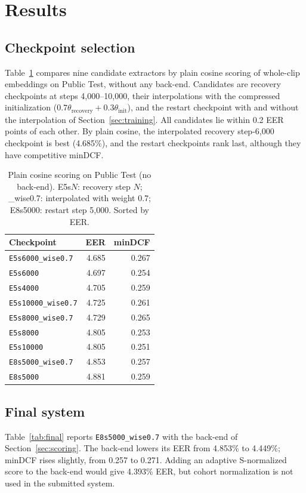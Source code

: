 \documentclass[11pt]{article}
\begin{document}
\section{Results}
\subsection{Checkpoint selection}
\label{sec:selection}
Table~\ref{tab:cosine} compares nine candidate extractors by plain cosine scoring of whole-clip embeddings on Public Test, without any back-end. Candidates are recovery checkpoints at steps 4,000--10,000, their interpolations with the compressed initialization ($0.7\theta_{\mathrm{recovery}}+0.3\theta_{\mathrm{init}}$), and the restart checkpoint with and without the interpolation of Section~\ref{sec:training}. All candidates lie within 0.2 EER points of each other. By plain cosine, the interpolated recovery step-6,000 checkpoint is best (4.685\%), and the restart checkpoints rank last, although they have competitive minDCF.

\begin{table}[t]
\centering
\small
\setlength{\tabcolsep}{3.5pt}
\begin{tabular}{@{}lrr@{}}
\toprule
Checkpoint & EER & minDCF \\
\midrule
\nolinkurl{E5s6000_wise0.7}  & 4.685 & 0.267 \\
\nolinkurl{E5s6000}          & 4.697 & 0.254 \\
\nolinkurl{E5s4000}          & 4.705 & 0.259 \\
\nolinkurl{E5s10000_wise0.7} & 4.725 & 0.261 \\
\nolinkurl{E5s8000_wise0.7}  & 4.729 & 0.265 \\
\nolinkurl{E5s8000}          & 4.805 & 0.253 \\
\nolinkurl{E5s10000}         & 4.805 & 0.251 \\
\nolinkurl{E8s5000_wise0.7}  & 4.853 & 0.257 \\
\nolinkurl{E8s5000}          & 4.881 & 0.259 \\
\bottomrule
\end{tabular}
\caption{Plain cosine scoring on Public Test (no back-end). E5s$N$: recovery step $N$; \_wise0.7: interpolated with weight 0.7; E8s5000: restart step 5,000. Sorted by EER.}
\label{tab:cosine}
\end{table}

\subsection{Final system}
Table~\ref{tab:final} reports \nolinkurl{E8s5000_wise0.7} with the back-end of Section~\ref{sec:scoring}. The back-end lowers its EER from 4.853\% to 4.449\%; minDCF rises slightly, from 0.257 to 0.271. Adding an adaptive S-normalized score to the back-end \citep{matejka2017normalization} would give 4.393\% EER, but cohort normalization is not used in the submitted system.
\end{document}
